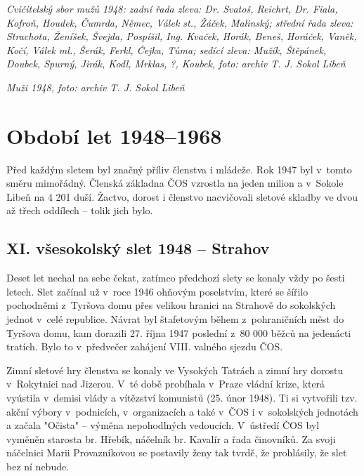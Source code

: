 \documentclass[a5paper, 12pt, twoside]{article}
\begin{document}

\textit{Cvičitelský sbor mužů 1948: zadní řada zleva: Dr. Svatoš, Reichrt,
Dr. Fiala, Kofroň, Houdek, Čumrda, Němec, Válek st., Žáček, Malinský;
střední řada zleva: Strachota, Ženíšek, Švejda, Pospíšil, Ing. Kvaček,
Horák, Beneš, Horáček, Vaněk, Kočí, Válek ml., Šerák, Ferkl, Čejka,
Tůma; sedící zleva: Mužík, Štěpánek, Doubek, Spurný, Jirák, Kodl,
Mrklas, ?, Koubek,} \textit{foto: archiv T. J. Sokol Libeň}


\textit{Muži 1948, foto: archiv T. J. Sokol Libeň}

\section{Období let 1948--1968}

Před každým sletem byl značný příliv členstva i mládeže. Rok 1947 byl
v~tomto směru mimořádný. Členská základna ČOS vzrostla na jeden milion a
v~Sokole Libeň na 4 201 duší. Žactvo, dorost i členstvo nacvičovali
sletové skladby ve dvou až třech oddílech -- tolik jich bylo.

\subsection{XI. všesokolský slet 1948 --
Strahov}

Deset let nechal na sebe čekat, zatímco předchozí slety se konaly vždy
po šesti letech. Slet začínal už v~roce 1946 ohňovým poselstvím, které
se šířilo pochodněmi z~Tyršova domu přes velikou hranici na Strahově do
sokolských jednot v~celé republice. Návrat byl štafetovým během
z~pohraničních měst do Tyršova domu, kam dorazili 27. října 1947 poslední
z~80 000 běžců na jedenácti tratích. Bylo to v~předvečer zahájení VIII.
valného sjezdu ČOS.

Zimní sletové hry členstva se konaly ve Vysokých Tatrách a zimní hry
dorostu v~Rokytnici nad Jizerou. V~té době probíhala v~Praze vládní
krize, která vyústila v~demisi vlády a vítězství komunistů (25. únor
1948). Ti si vytvořili tzv. akční výbory v~podnicích, v~organizacích a
také v~ČOS i v~sokolských jednotách a začala "Očista" -- výměna
nepohodlných vedoucích. V~ústředí ČOS byl vyměněn starosta br. Hřebík,
náčelník br. Kavalír a řada činovníků. Za svoji náčelnici Marii
Provazníkovou se postavily ženy tak tvrdě, že prohlásily, že slet bez ní
nebude.
\end{document}
